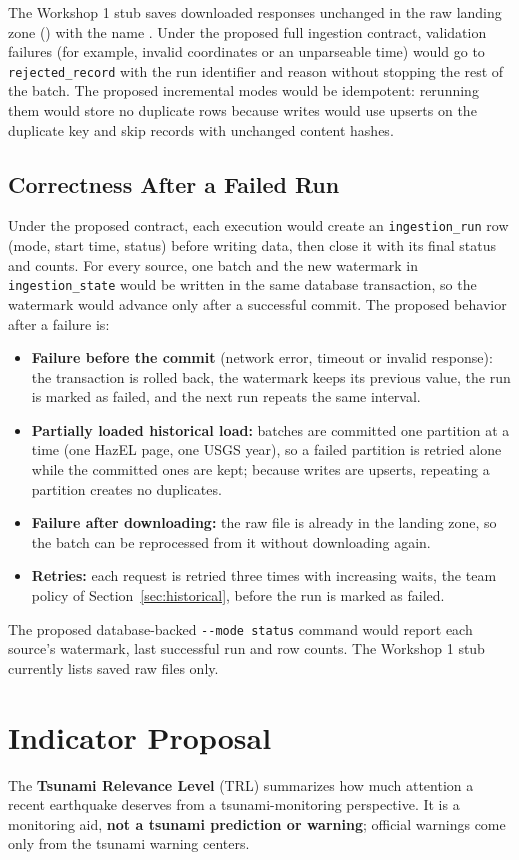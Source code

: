 \documentclass[a4paper,11pt,oneside]{book}
\begin{document}
The Workshop 1 stub saves downloaded responses unchanged in the raw landing zone () with the name . Under the proposed full ingestion contract, validation failures (for example, invalid coordinates or an unparseable time) would go to \texttt{rejected\_record} with the run identifier and reason without stopping the rest of the batch.
The proposed incremental modes would be idempotent: rerunning them would store no duplicate rows because writes would use upserts on the duplicate key and skip records with unchanged content hashes.

\subsection{Correctness After a Failed Run}
Under the proposed contract, each execution would create an \texttt{ingestion\_run} row (mode, start time, status) before writing data, then close it with its final status and counts.
For every source, one batch and the new watermark in \texttt{ingestion\_state} would be written in the same database transaction, so the watermark would advance only after a successful commit.
The proposed behavior after a failure is:
\begin{itemize}[nosep]
  \item \textbf{Failure before the commit} (network error, timeout or invalid response): the transaction is rolled back, the watermark keeps its previous value, the run is marked as failed, and the next run repeats the same interval.
  \item \textbf{Partially loaded historical load:} batches are committed one partition at a time (one HazEL page, one USGS year), so a failed partition is retried alone while the committed ones are kept; because writes are upserts, repeating a partition creates no duplicates.
  \item \textbf{Failure after downloading:} the raw file is already in the landing zone, so the batch can be reprocessed from it without downloading again.
  \item \textbf{Retries:} each request is retried three times with increasing waits, the team policy of Section~\ref{sec:historical}, before the run is marked as failed.
\end{itemize}
The proposed database-backed \texttt{-{}-mode status} command would report each source's watermark, last successful run and row counts. The Workshop 1 stub currently lists saved raw files only.

\section{Indicator Proposal}
\label{sec:indicator}
The \textbf{Tsunami Relevance Level} (TRL) summarizes how much attention a recent earthquake deserves from a tsunami-monitoring perspective.
It is a monitoring aid, \textbf{not a tsunami prediction or warning}; official warnings come only from the tsunami warning centers.
\end{document}

